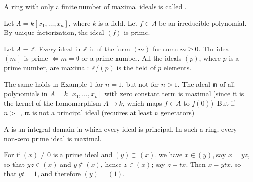 A ring with only a finite number of maximal ideals is called .

\begin{eg}
Let \( A = k[x_1, \ldots, x_n] \), where \( k \) is a field. Let \( f \in A \) be an irreducible polynomial. By unique factorization, the ideal \( (f) \) is prime.
\end{eg}

\begin{eg}
Let \( A = \mathbb{Z} \). Every ideal in \( \mathbb{Z} \) is of the form \( (m) \) for some \( m \ge 0 \). The ideal \( (m) \) is prime \( \Leftrightarrow m = 0 \) or a prime number. All the ideals \( (p) \), where \( p \) is a prime number, are maximal: \( \mathbb{Z}/(p) \) is the field of \( p \) elements.
\end{eg}

\begin{remark}
The same holds in Example 1 for \( n = 1 \), but not for \( n > 1 \). 
The ideal \( \mathfrak{m} \) of all polynomials in \( A = k[x_1, 
\ldots, x_n] \) with zero constant term is maximal (since it is the 
kernel of the homomorphism \( A \to k \), which maps \( f \in A \) to 
\( f(0) \)). But if \( n > 1 \), \( \mathfrak{m} \) is not a principal
 ideal (requires at least \( n \) generators).
\end{remark}

\begin{eg}
A  is an integral domain in which every ideal is principal. In such a ring, every non-zero prime ideal is maximal.

For if \( (x) \ne 0 \) is a prime ideal and \( (y) \supset (x) \), we have \( x \in (y) \), say \( x = yz \), so that \( yz \in (x) \) and \( y \notin (x) \), hence \( z \in (x) \); say \( z = tx \). Then \( x = ytx \), so that \( yt = 1 \), and therefore \( (y) = (1) \).
\end{eg}



        
        

        
